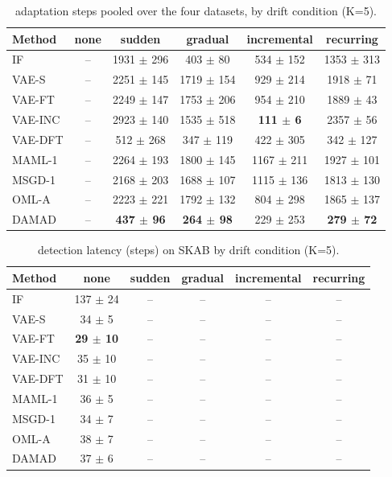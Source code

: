 \begin{table}[t]
\centering
\small
\caption{adaptation steps pooled over the four datasets, by drift condition (K=5).}
\label{tab:drift_adaptation_steps_all}
\begin{tabular}{lccccc}
\toprule
Method & none & sudden & gradual & incremental & recurring \\
\midrule
IF & – & 1931 $\pm$ 296 & 403 $\pm$ 80 & 534 $\pm$ 152 & 1353 $\pm$ 313 \\
VAE-S & – & 2251 $\pm$ 145 & 1719 $\pm$ 154 & 929 $\pm$ 214 & 1918 $\pm$ 71 \\
VAE-FT & – & 2249 $\pm$ 147 & 1753 $\pm$ 206 & 954 $\pm$ 210 & 1889 $\pm$ 43 \\
VAE-INC & – & 2923 $\pm$ 140 & 1535 $\pm$ 518 & \textbf{111 $\pm$ 6} & 2357 $\pm$ 56 \\
VAE-DFT & – & 512 $\pm$ 268 & 347 $\pm$ 119 & 422 $\pm$ 305 & 342 $\pm$ 127 \\
MAML-1 & – & 2264 $\pm$ 193 & 1800 $\pm$ 145 & 1167 $\pm$ 211 & 1927 $\pm$ 101 \\
MSGD-1 & – & 2168 $\pm$ 203 & 1688 $\pm$ 107 & 1115 $\pm$ 136 & 1813 $\pm$ 130 \\
OML-A & – & 2223 $\pm$ 221 & 1792 $\pm$ 132 & 804 $\pm$ 298 & 1865 $\pm$ 137 \\
DAMAD & – & \textbf{437 $\pm$ 96} & \textbf{264 $\pm$ 98} & 229 $\pm$ 253 & \textbf{279 $\pm$ 72} \\
\bottomrule
\end{tabular}
\end{table}

\begin{table}[t]
\centering
\small
\caption{detection latency (steps) on SKAB by drift condition (K=5).}
\label{tab:drift_latency_mean_skab}
\begin{tabular}{lccccc}
\toprule
Method & none & sudden & gradual & incremental & recurring \\
\midrule
IF & 137 $\pm$ 24 & – & – & – & – \\
VAE-S & 34 $\pm$ 5 & – & – & – & – \\
VAE-FT & \textbf{29 $\pm$ 10} & – & – & – & – \\
VAE-INC & 35 $\pm$ 10 & – & – & – & – \\
VAE-DFT & 31 $\pm$ 10 & – & – & – & – \\
MAML-1 & 36 $\pm$ 5 & – & – & – & – \\
MSGD-1 & 34 $\pm$ 7 & – & – & – & – \\
OML-A & 38 $\pm$ 7 & – & – & – & – \\
DAMAD & 37 $\pm$ 6 & – & – & – & – \\
\bottomrule
\end{tabular}
\end{table}

